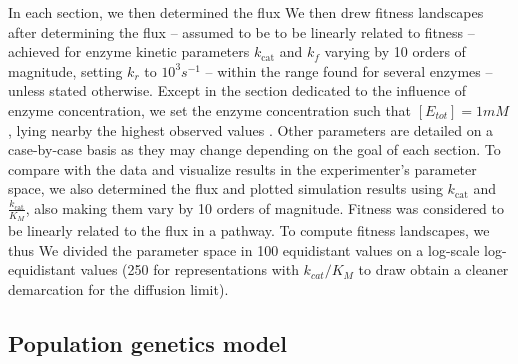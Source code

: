 \documentclass[11pt,onecolumn]{article}
\providecommand{\DIFadd}[1]{{\protect\color{blue} \sf #1}} %
\providecommand{\DIFdel}[1]{{\protect\color{red} \scriptsize #1}} %
\providecommand{\DIFaddbegin}{} %
\providecommand{\DIFaddend}{} %
\providecommand{\DIFdelbegin}{} %
\providecommand{\DIFdelend}{} %
\begin{document}
\DIFdelbegin \DIFdel{In each section, we then determined the flux }\DIFdelend \DIFaddbegin \DIFadd{We then drew fitness landscapes after determining the flux -- assumed to be to be linearly related to fitness -- }\DIFaddend achieved for enzyme kinetic parameters $k_\text{cat}$ and $k_f$ varying by 10 orders of magnitude, setting $k_r$ to $10^3 s^{-1}$ -- within the range found for several enzymes \citep{Klipp94,Knowles77} -- unless stated otherwise. Except in the section dedicated to the influence of enzyme concentration, we set the enzyme concentration such that $[E_{tot}]=1mM$, lying nearby the highest observed values \citep{Albe90,Noor16}. Other parameters are detailed on a case-by-case basis as they may change depending on the goal of each section. To compare with the data and visualize results in the experimenter's parameter space, we also determined the flux and plotted simulation results using $k_\text{cat}$ and $\frac{k_\text{cat}}{K_M}$, also making them vary by 10 orders of magnitude. \DIFdelbegin \DIFdel{Fitness was considered to be linearly related to the flux in a pathway. To compute fitness landscapes, we thus }\DIFdelend \DIFaddbegin \DIFadd{We }\DIFaddend divided the parameter space in 100 \DIFdelbegin \DIFdel{equidistant values on a log-scale }\DIFdelend \DIFaddbegin \DIFadd{log-equidistant values }\DIFaddend (250 for representations with $k_{cat}/K_M$ to \DIFdelbegin \DIFdel{draw }\DIFdelend \DIFaddbegin \DIFadd{obtain }\DIFaddend a cleaner demarcation for the diffusion limit).

\subsection{Population genetics model}
\end{document}
